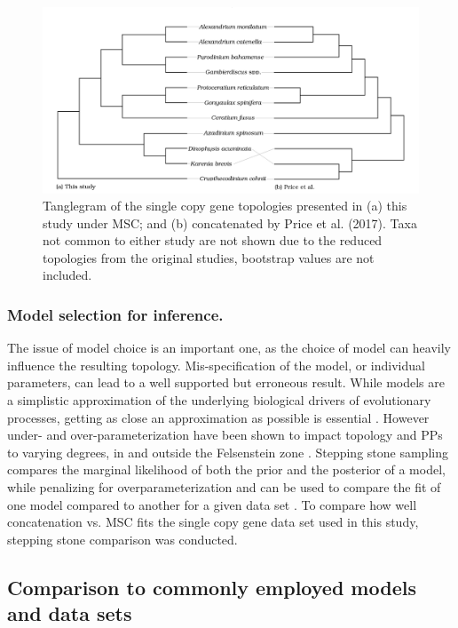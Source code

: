 \documentclass[fleqn,10pt,lineno]{wlpeerj} %
\begin{document}
\begin{figure}[ht]
\centering
\includegraphics[width=\linewidth]{gonya-figs/Price-comparison.png}
\caption{Tanglegram of the single copy gene topologies presented in (a) this study under MSC; and (b) concatenated by Price et al. (2017). Taxa not common to either study are not shown due to the reduced topologies from the original studies, bootstrap values are not included.}  %
\label{fig:tanglePrice}
\end{figure} 
\subsubsection*{Model selection for inference.} The issue of model choice is an important one, as the choice of model can heavily influence the resulting topology. 
Mis-specification of the model, or individual parameters, can lead to a well supported but erroneous result. 
While models are a simplistic approximation of the underlying biological drivers of evolutionary processes, getting as close an approximation as possible is essential \cite{box1979all}. 
However under- and over-parameterization have been shown to impact topology and PPs to varying degrees, in and outside the Felsenstein zone \cite{lemmon2004importance}. 
Stepping stone sampling compares the marginal likelihood of both the prior and the posterior of a model, while penalizing for overparameterization and can be used to compare the fit of one model compared to another for a given data set \cite{xie2010improving}. 
To compare how well concatenation vs. MSC fits the single copy gene data set used in this study, stepping stone comparison was conducted.

\subsection*{Comparison to commonly employed models and data sets}
\end{document}

